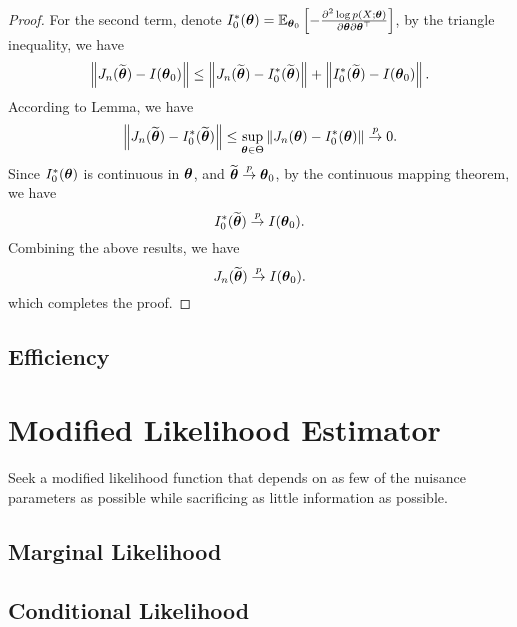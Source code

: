 \begin{proof}
	For the second term, denote \(I_{0}^{*}(\boldsymbol{\theta})=\mathbb{E}_{\boldsymbol{\theta}_{0}}\left[-\frac{\partial^{2}\log p(X;\boldsymbol{\theta})}{\partial\boldsymbol{\theta}\partial\boldsymbol{\theta}^{\top}}\right]\), by the triangle inequality, we have
	\begin{equation*}
		\left\|J_{n}(\widetilde{\boldsymbol{\theta}})-I(\boldsymbol{\theta}_{0})\right\|\leq\left\|J_{n}(\widetilde{\boldsymbol{\theta}})-I_{0}^{*}(\widetilde{\boldsymbol{\theta}})\right\|+\left\|I_{0}^{*}(\widetilde{\boldsymbol{\theta}})-I(\boldsymbol{\theta}_{0})\right\|.
	\end{equation*}
	According to Lemma, we have
	\begin{equation*}
		\left\|J_{n}(\widetilde{\boldsymbol{\theta}})-I_{0}^{*}(\widetilde{\boldsymbol{\theta}})\right\|\leq\sup_{\boldsymbol{\theta}\in\Theta}\left\|J_{n}(\boldsymbol{\theta})-I_{0}^{*}(\boldsymbol{\theta})\right\|\stackrel{p}{\rightarrow}0.
	\end{equation*}
	Since \(I_{0}^{*}(\boldsymbol{\theta})\) is continuous in \(\boldsymbol{\theta}\), and \(\widetilde{\boldsymbol{\theta}}\stackrel{p}{\rightarrow}\boldsymbol{\theta}_{0}\), by the continuous mapping theorem, we have
	\begin{equation*}
		I_{0}^{*}(\widetilde{\boldsymbol{\theta}})\stackrel{p}{\rightarrow}I(\boldsymbol{\theta}_{0}).
	\end{equation*}
	Combining the above results, we have
	\begin{equation*}
		J_{n}(\widetilde{\boldsymbol{\theta}})\stackrel{p}{\rightarrow}I(\boldsymbol{\theta}_{0}).
	\end{equation*}
	which completes the proof.
\end{proof}

\subsection{Efficiency}

\section{Modified Likelihood Estimator}

Seek a modified likelihood function that depends on as few of the nuisance parameters as possible while sacrificing as little information as possible.

\subsection{Marginal Likelihood}

\subsection{Conditional Likelihood}

